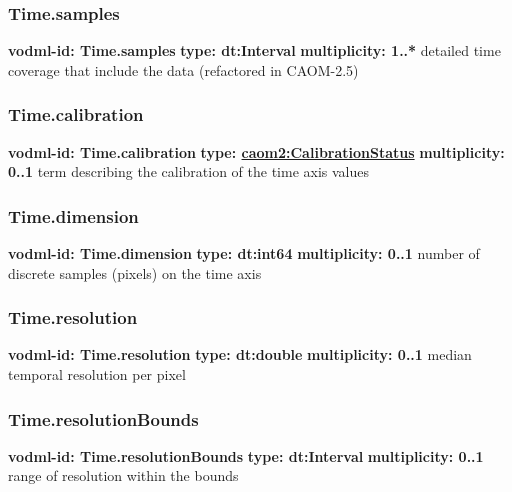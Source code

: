     \subsubsection{Time.samples}
      \textbf{vodml-id: Time.samples} \newline
      \textbf{type: dt:Interval} \newline
      \textbf{multiplicity: 1..*} \newline
      detailed time coverage that include the data (refactored in CAOM-2.5)

    \subsubsection{Time.calibration}
      \textbf{vodml-id: Time.calibration} \newline
      \textbf{type: \hyperref[sect:CalibrationStatus]{caom2:CalibrationStatus}} \newline
      \textbf{multiplicity: 0..1} \newline
      term describing the calibration of the time axis values

    \subsubsection{Time.dimension}
      \textbf{vodml-id: Time.dimension} \newline
      \textbf{type: dt:int64} \newline
      \textbf{multiplicity: 0..1} \newline
      number of discrete samples (pixels) on the time axis

    \subsubsection{Time.resolution}
      \textbf{vodml-id: Time.resolution} \newline
      \textbf{type: dt:double} \newline
      \textbf{multiplicity: 0..1} \newline
      median temporal resolution per pixel

    \subsubsection{Time.resolutionBounds}
      \textbf{vodml-id: Time.resolutionBounds} \newline
      \textbf{type: dt:Interval} \newline
      \textbf{multiplicity: 0..1} \newline
      range of resolution within the bounds


